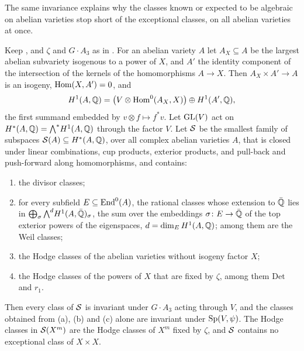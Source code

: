 The same invariance explains why the classes known or expected to be
algebraic on abelian varieties stop short of the exceptional classes, on all
abelian varieties at once.

\begin{proposition}\label{prop:mumfordformal}
Keep , and $\zeta$ and $G\cdot A_{3}$ as in
. For an abelian variety $A$ let $A_{X}\subseteq A$
be the largest abelian subvariety isogenous to a power of $X$, and $A'$ the
identity component of the intersection of the kernels of the homomorphisms
$A\to X$. Then $A_{X}\times A'\to A$ is an isogeny, $\operatorname{Hom}(X,A')=0$, and
\[
  H^{1}(A,\mathbb{Q})=\bigl(V\otimes\operatorname{Hom}^{0}(A_{X},X)\bigr)\oplus H^{1}(A',\mathbb{Q}),
\]
the first summand embedded by $v\otimes f\mapsto f^{*}v$. Let $\operatorname{GL}(V)$ act on
$H^{*}(A,\mathbb{Q})={\textstyle\bigwedge^{*}}H^{1}(A,\mathbb{Q})$ through the factor $V$. Let $\mathcal{S}$
be the smallest family of subspaces $\mathcal{S}(A)\subseteq H^{*}(A,\mathbb{Q})$, over all
complex abelian varieties $A$, that is closed under linear combinations, cup
products, exterior products, and pull-back and push-forward along
homomorphisms, and contains:
\begin{enumerate}[label=\textup{(\alph*)},leftmargin=2.6em,itemsep=1pt]
\item the divisor classes;
\item for every subfield $E\subseteq\operatorname{End}^{0}(A)$, the rational classes whose
  extension to $\bar{\mathbb{Q}}$ lies in $\bigoplus_{\sigma}{\textstyle\bigwedge^{d}}
  H^{1}(A,\bar{\mathbb{Q}})_{\sigma}$, the sum over the embeddings
  $\sigma\colon E\to\bar{\mathbb{Q}}$ of the top exterior powers of the eigenspaces,
  $d=\dim_{E}H^{1}(A,\mathbb{Q})$; among them are the Weil classes;
\item the Hodge classes of the abelian varieties without isogeny factor $X$;
\item the Hodge classes of the powers of $X$ that are fixed by $\zeta$, among
  them $\mathrm{Det}$ and $r_{1}$.
\end{enumerate}
Then every class of $\mathcal{S}$ is invariant under $G\cdot A_{3}$ acting through
$V$, and the classes obtained from \textup{(a)}, \textup{(b)} and
\textup{(c)} alone are invariant under $\operatorname{Sp}(V,\psi)$. The Hodge classes in
$\mathcal{S}(X^{m})$ are the Hodge classes of $X^{m}$ fixed by $\zeta$, and $\mathcal{S}$
contains no exceptional class of $X\times X$.
\end{proposition}

